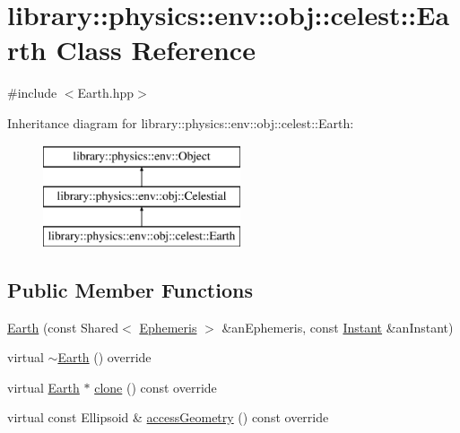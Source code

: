 \hypertarget{classlibrary_1_1physics_1_1env_1_1obj_1_1celest_1_1_earth}{}\section{library\+:\+:physics\+:\+:env\+:\+:obj\+:\+:celest\+:\+:Earth Class Reference}
\label{classlibrary_1_1physics_1_1env_1_1obj_1_1celest_1_1_earth}


{\ttfamily \#include $<$Earth.\+hpp$>$}

Inheritance diagram for library\+:\+:physics\+:\+:env\+:\+:obj\+:\+:celest\+:\+:Earth\+:\begin{figure}[H]
\begin{center}
\leavevmode
\includegraphics[height=3.000000cm]{classlibrary_1_1physics_1_1env_1_1obj_1_1celest_1_1_earth}
\end{center}
\end{figure}
\subsection*{Public Member Functions}
\begin{DoxyCompactItemize}
\item 
\hyperlink{classlibrary_1_1physics_1_1env_1_1obj_1_1celest_1_1_earth_a3e239fd6fca2ff160308e217af4057bb}{Earth} (const Shared$<$ \hyperlink{classlibrary_1_1physics_1_1env_1_1_ephemeris}{Ephemeris} $>$ \&an\+Ephemeris, const \hyperlink{classlibrary_1_1physics_1_1time_1_1_instant}{Instant} \&an\+Instant)
\item 
virtual \hyperlink{classlibrary_1_1physics_1_1env_1_1obj_1_1celest_1_1_earth_a93fbd2015a7c7d786654919197c63963}{$\sim$\+Earth} () override
\item 
virtual \hyperlink{classlibrary_1_1physics_1_1env_1_1obj_1_1celest_1_1_earth}{Earth} $\ast$ \hyperlink{classlibrary_1_1physics_1_1env_1_1obj_1_1celest_1_1_earth_aca39bec00a2046a3fcef9bf22be52428}{clone} () const override
\item 
virtual const Ellipsoid \& \hyperlink{classlibrary_1_1physics_1_1env_1_1obj_1_1celest_1_1_earth_a5c6a6a902eb52c3f74e20dd7aa5ad359}{access\+Geometry} () const override
\end{DoxyCompactItemize}
